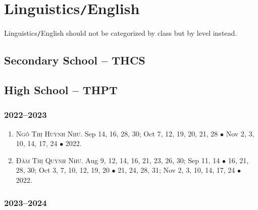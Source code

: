 \documentclass{article}
\begin{document}

\section{Linguistics\texttt{/}English}
Linguistics\texttt{/}English should not be categorized by class but by level instead.

\subsection{Secondary School -- THCS}


\subsection{High School -- THPT}

\subsubsection{2022--2023}

\begin{enumerate}
	\item \textsc{Ngô Thị Huỳnh Như.} {\sf[In]} Sep 14, 16, 28, 30; Oct 7, 12, 19, 20, 21, 28 $\bullet$ Nov 2, 3, 10, 14, 17, 24 $\bullet$ 2022. {\sf[Out]}
	\item \textsc{Đàm Thị Quỳnh Như.} {\sf[In]} Aug 9, 12, 14, 16, 21, 23, 26, 30; Sep 11, 14 $\bullet$ 16, 21, 28, 30; Oct 3, 7, 10, 12, 19, 20 $\bullet$ 21, 24, 28, 31; Nov 2, 3, 10, 14, 17, 24 $\bullet$ 2022. {\sf[Out]}
\end{enumerate}

\subsubsection{2023--2024}


\printbibliography[heading=bibintoc]
	
\end{document}

